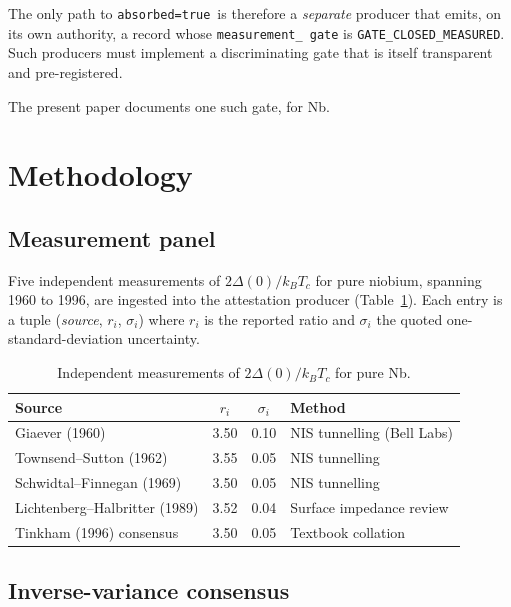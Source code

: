 \documentclass[11pt,a4paper]{article}
\newcommand{\absorbedtrue}{\textcolor{honestgreen}{\texttt{absorbed=true}}}
\newcommand{\gateclosedmeas}{\texttt{GATE\_CLOSED\_MEASURED}}
\begin{document}
The only path to \absorbedtrue\ is therefore a \emph{separate} producer
that emits, on its own authority, a record whose \texttt{measurement\_
gate} is \gateclosedmeas. Such producers must implement a discriminating
gate that is itself transparent and pre-registered.

The present paper documents one such gate, for Nb.

\section{Methodology}
\label{sec:method}

\subsection{Measurement panel}

Five independent measurements of \(2\Delta(0)/k_{B}T_{c}\) for pure
niobium, spanning 1960 to 1996, are ingested into the attestation
producer (Table~\ref{tab:nb-measurements}). Each entry is a tuple
(\textit{source}, \(r_{i}\), \(\sigma_{i}\)) where \(r_{i}\) is the
reported ratio and \(\sigma_{i}\) the quoted one-standard-deviation
uncertainty.

\begin{table}[h]
\centering
\caption{Independent measurements of \(2\Delta(0)/k_{B}T_{c}\) for pure Nb.}
\label{tab:nb-measurements}
\begin{tabular}{lccl}
\toprule
Source & \(r_{i}\) & \(\sigma_{i}\) & Method \\
\midrule
Giaever (1960) \cite{giaever1960}        & 3.50 & 0.10 & NIS tunnelling (Bell Labs) \\
Townsend--Sutton (1962) \cite{townsend1962} & 3.55 & 0.05 & NIS tunnelling \\
Schwidtal--Finnegan (1969) \cite{schwidtal1969} & 3.50 & 0.05 & NIS tunnelling \\
Lichtenberg--Halbritter (1989) \cite{lichtenberg1989} & 3.52 & 0.04 & Surface impedance review \\
Tinkham (1996) consensus \cite{tinkham1996} & 3.50 & 0.05 & Textbook collation \\
\bottomrule
\end{tabular}
\end{table}

\subsection{Inverse-variance consensus}
\end{document}
